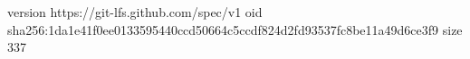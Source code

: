 version https://git-lfs.github.com/spec/v1
oid sha256:1da1e41f0ee0133595440ccd50664c5ccdf824d2fd93537fc8be11a49d6ce3f9
size 337
